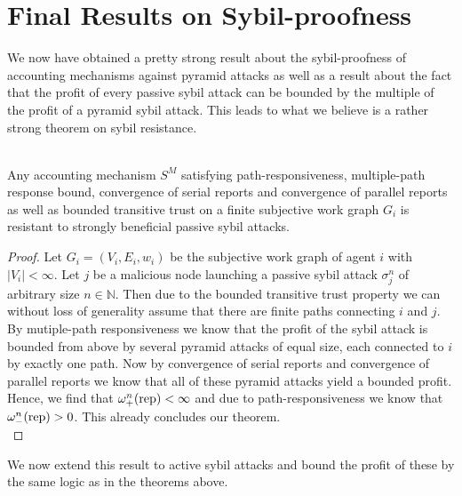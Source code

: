 \section{Final Results on Sybil-proofness}
\label{sec:Final Results on Sybil-proofness}
\noindent{}We now have obtained a pretty strong result about the sybil-proofness of accounting mechanisms against pyramid attacks as well as a result about the fact that the profit of every passive sybil attack can be bounded by the multiple of the profit of a pyramid sybil attack. This leads to what we believe is a rather strong theorem on sybil resistance.\vspace{1em}\\

\begin{theorem}[]\ \\
\label{th:Strongly Beneficial Passive Sybil Attack Theorem}
\noindent{}Any accounting mechanism $S^M$ satisfying path-responsiveness, multiple-path response bound, convergence of serial reports and convergence of parallel reports as well as bounded transitive trust on a finite subjective work graph $G_i$ is resistant to strongly beneficial passive sybil attacks. 
\end{theorem}
\begin{proof}

\noindent{}Let $G_i=(V_i,E_i,w_i)$ be the subjective work graph of agent $i$ with $|V_i|<\infty$. Let $j$ be a malicious node launching a passive sybil attack $\sigma_j^n$ of arbitrary size $n\in\mathbb{N}$. Then due to the bounded transitive trust property we can without loss of generality assume that there are finite paths connecting $i$ and $j$. By mutiple-path responsiveness we know that the profit of the sybil attack is bounded from above by several pyramid attacks of equal size, each connected to $i$ by exactly one path. Now by convergence of serial reports and convergence of parallel reports we know that all of these pyramid attacks yield a bounded profit. Hence, we find that $\omega_{+}^n({\rm rep})<\infty$ and due to path-responsiveness we know that $\omega_{-}^n({\rm rep})>0$. This already concludes our theorem.\vspace{1em}\\
\end{proof}

\noindent{}We now extend this result to active sybil attacks and bound the profit of these by the same logic as in the theorems above.\vspace{1em}\\

